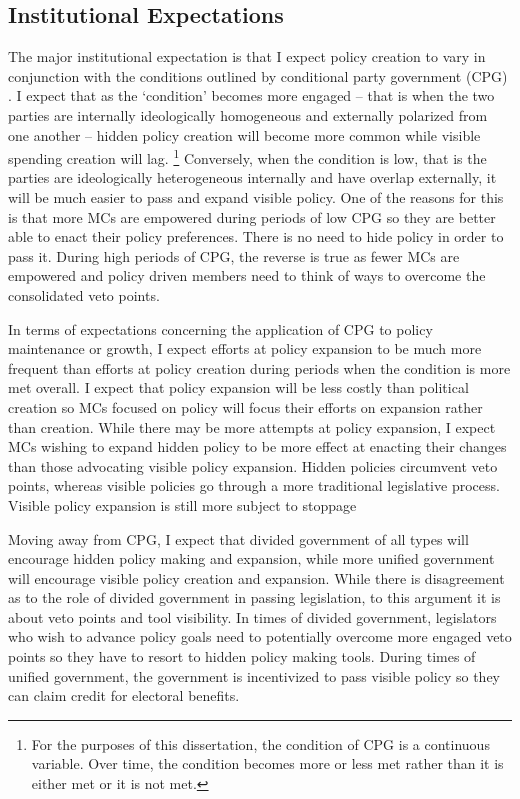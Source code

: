 \documentclass[12pt]{article}
\begin{document}
\subsection{Institutional Expectations}
The major institutional expectation is that I expect policy creation to vary in conjunction with the conditions outlined by conditional party government (CPG) \citep{rohde1991}. I expect that as the `condition' becomes more engaged -- that is when the two parties are internally ideologically homogeneous and externally polarized from one another -- hidden policy creation will become more common while visible spending creation will lag. \footnote{For the purposes of this dissertation, the condition of CPG is a continuous variable. Over time, the condition becomes more or less met rather than it is either met or it is not met.} Conversely, when the condition is low, that is the parties are ideologically heterogeneous internally and have overlap externally, it will be much easier to pass  and expand visible policy. One of the reasons for this is that more MCs are empowered during periods of low CPG so they are better able to enact their policy preferences. There is no need to hide policy in order to pass it. During high periods of CPG, the reverse is true as fewer MCs are empowered and policy driven members need to think of ways to overcome the consolidated veto points.

In terms of expectations concerning the application of CPG to policy maintenance or growth, I expect efforts at policy expansion to be much more frequent than efforts at policy creation during periods when the condition is more met overall. I expect that policy expansion will be less costly than political creation so MCs focused on policy will focus their efforts on expansion rather than creation. While there may be more attempts at policy expansion, I expect MCs wishing to expand hidden policy to be more effect at enacting their changes than those advocating visible policy expansion. Hidden policies circumvent veto points, whereas visible policies go through a more traditional legislative process. Visible policy expansion is still more subject to stoppage 

Moving away from CPG, I expect that divided government of all types will encourage hidden policy making and expansion, while more unified government will encourage visible policy creation and expansion. While there is disagreement as to the role of divided government in passing legislation, to this argument it is about veto points and tool visibility. In times of divided government, legislators who wish to advance policy goals need to potentially overcome more engaged veto points so they have to resort to hidden policy making tools. During times of unified government, the government is incentivized to pass visible policy so they can claim credit for electoral benefits.
\end{document}

